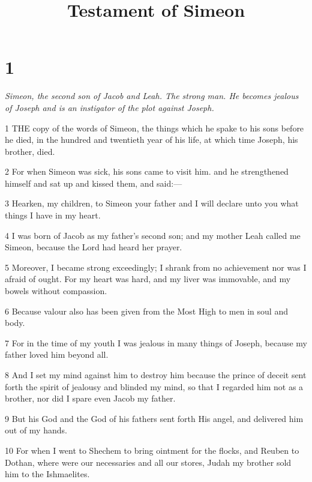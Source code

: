 

\title{Testament of Simeon}

\chapter{1}

\par \textit{Simeon, the second son of Jacob and Leah. The strong man. He becomes jealous of Joseph and is an instigator of the plot against Joseph.}

\par 1 THE copy of the words of Simeon, the things which he spake to his sons before he died, in the hundred and twentieth year of his life, at which time Joseph, his brother, died.

\par 2 For when Simeon was sick, his sons came to visit him. and he strengthened himself and sat up and kissed them, and said:—

\par 3 Hearken, my children, to Simeon your father and I will declare unto you what things I have in my heart.

\par 4 I was born of Jacob as my father's second son; and my mother Leah called me Simeon, because the Lord had heard her prayer.

\par 5 Moreover, I became strong exceedingly; I shrank from no achievement nor was I afraid of ought. For my heart was hard, and my liver was immovable, and my bowels without compassion.

\par 6 Because valour also has been given from the Most High to men in soul and body.

\par 7 For in the time of my youth I was jealous in many things of Joseph, because my father loved him beyond all.

\par 8 And I set my mind against him to destroy him because the prince of deceit sent forth the spirit of jealousy and blinded my mind, so that I regarded him not as a brother, nor did I spare even Jacob my father.

\par 9 But his God and the God of his fathers sent forth His angel, and delivered him out of my hands.

\par 10 For when I went to Shechem to bring ointment for the flocks, and Reuben to Dothan, where were our necessaries and all our stores, Judah my brother sold him to the Ishmaelites.

